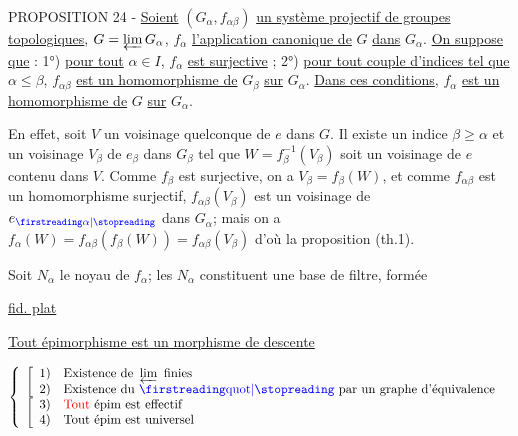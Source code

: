PROPOSITION 24 - \uline{Soient} $(G_\alpha,f_{\alpha\beta})$ \uline{un système projectif de groupes topologiques}, $G=\varprojlim G_\alpha$, $f_\alpha$ \uline{l'application canonique de} $G$ \uline{dans} $G_\alpha$. \uline{On suppose que} : 1°) \uline{pour tout} $\alpha\in I$, $f_\alpha$ \uline{est surjective} ; 2°) \uline{pour tout couple d'indices tel que} $\alpha\leq\beta$, $f_{\alpha\beta}$ \uline{est un homomorphisme de} $G_\beta$ \uline{sur} $G_\alpha$. \uline{Dans ces conditions}, $f_\alpha$ \uline{est un homomorphisme de} $G$ \uline{sur} $G_\alpha$.

En effet, soit $V$ un voisinage quelconque de $e$ dans $G$. Il existe un indice $\beta\geq\alpha$ et un voisinage $V_\beta$ de $e_\beta$ dans $G_\beta$ tel que $W=f_\beta^{-1}(V_\beta)$ soit un voisinage de $e$ contenu dans $V$. Comme $f_\beta$ est surjective, on a $V_\beta=f_\beta(W)$, et comme $f_{\alpha\beta}$ est un homomorphisme surjectif, $f_{\alpha\beta}(V_\beta)$ est un voisinage de $e_{\unsure{\alpha}}$ dans $G_\alpha$; mais on a $f_\alpha(W)=f_{\alpha\beta}(f_\beta(W))=f_{\alpha\beta}(V_\beta)$ d'où la proposition (th.1).

Soit $N_\alpha$ le noyau de $f_\alpha$; les $N_\alpha$ constituent une base de filtre, formée





\hfill\uline{ fid. plat}

\uline{Tout épimorphisme est un morphisme de descente}

\[
\left\{\begin{array}{l}
\left[\begin{array}{ll}
1)&\text{Existence de }\varprojlim\text{ finies}\\
2)&\text{Existence du }\unsure{\text{quot}}\text{ par un graphe d'équivalence}
\end{array}\right.\\[4pt]
\left[\begin{array}{ll}
3)&\deleted{\text{Tout}}\ \text{épim est effectif}\\
4)&\text{Tout épim est universel}
\end{array}\right.
\end{array}\right.
\]

